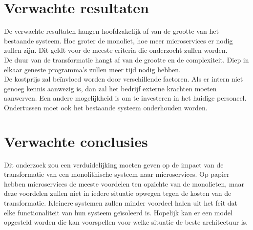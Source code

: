 \section{Verwachte resultaten}
\label{sec:verwachte_resultaten}

De verwachte resultaten hangen hoofdzakelijk af van de grootte van het bestaande systeem. Hoe groter de monoliet, hoe meer microservices er nodig zullen zijn. Dit geldt voor de meeste criteria die onderzocht zullen worden.\\
De duur van de transformatie hangt af van de grootte en de complexiteit. Diep in elkaar geneste programma's zullen meer tijd nodig hebben.\\
De kostprijs zal beïnvloed worden door verschillende factoren. Als er intern niet genoeg kennis aanwezig is, dan zal het bedrijf externe krachten moeten aanwerven. Een andere mogelijkheid is om te investeren in het huidige personeel. Ondertussen moet ook het bestaande systeem onderhouden worden.

\section{Verwachte conclusies}
\label{sec:verwachte_conclusies}
Dit onderzoek zou een verduidelijking moeten geven op de impact van de transformatie van een monolithische systeem naar microservices. Op papier hebben microservices de meeste voordelen ten opzichte van de monolieten, maar deze voordelen zullen niet in iedere situatie opwegen tegen de kosten van de transformatie. Kleinere systemen zullen minder voordeel halen uit het feit dat elke functionaliteit van hun systeem geïsoleerd is. 
Hopelijk kan er een model opgesteld worden die kan voorspellen voor welke situatie de beste architectuur is.

